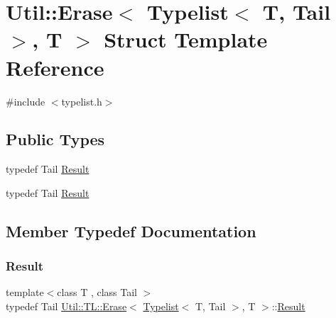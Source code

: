 \hypertarget{structUtil_1_1TL_1_1Erase_3_01Typelist_3_01T_00_01Tail_01_4_00_01T_01_4}{}\section{Util\+:\+:Erase$<$ Typelist$<$ T, Tail $>$, T $>$ Struct Template Reference}
\label{structUtil_1_1TL_1_1Erase_3_01Typelist_3_01T_00_01Tail_01_4_00_01T_01_4}


{\ttfamily \#include $<$typelist.\+h$>$}

\subsection*{Public Types}
\begin{DoxyCompactItemize}
\item 
typedef Tail \mbox{\hyperlink{structUtil_1_1TL_1_1Erase_3_01Typelist_3_01T_00_01Tail_01_4_00_01T_01_4_a847c2a353c4f86e0785cca222a67564e}{Result}}
\item 
typedef Tail \mbox{\hyperlink{structUtil_1_1TL_1_1Erase_3_01Typelist_3_01T_00_01Tail_01_4_00_01T_01_4_a847c2a353c4f86e0785cca222a67564e}{Result}}
\end{DoxyCompactItemize}


\subsection{Member Typedef Documentation}
\mbox{\label{structUtil_1_1TL_1_1Erase_3_01Typelist_3_01T_00_01Tail_01_4_00_01T_01_4_a847c2a353c4f86e0785cca222a67564e}} 
\subsubsection{\texorpdfstring{Result}{Result}\hspace{0.1cm}{\footnotesize\ttfamily [1/2]}}
{\footnotesize\ttfamily template$<$class T , class Tail $>$ \\
typedef Tail \mbox{\hyperlink{structUtil_1_1TL_1_1Erase}{Util\+::\+T\+L\+::\+Erase}}$<$ \mbox{\hyperlink{structUtil_1_1Typelist}{Typelist}}$<$ T, Tail $>$, T $>$\+::\mbox{\hyperlink{structUtil_1_1TL_1_1Erase_3_01Typelist_3_01T_00_01Tail_01_4_00_01T_01_4_a847c2a353c4f86e0785cca222a67564e}{Result}}}


